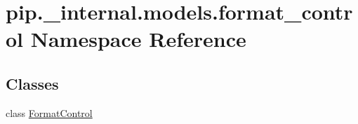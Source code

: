 \hypertarget{namespacepip_1_1__internal_1_1models_1_1format__control}{}\section{pip.\+\_\+internal.\+models.\+format\+\_\+control Namespace Reference}
\label{namespacepip_1_1__internal_1_1models_1_1format__control}
\subsection*{Classes}
\begin{DoxyCompactItemize}
\item 
class \hyperlink{classpip_1_1__internal_1_1models_1_1format__control_1_1FormatControl}{Format\+Control}
\end{DoxyCompactItemize}
